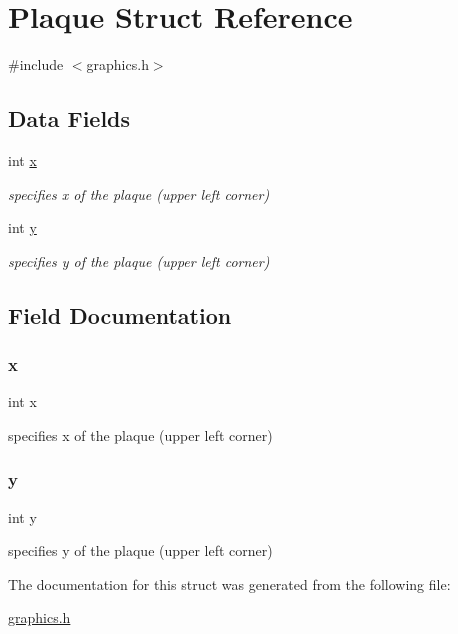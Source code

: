 \hypertarget{struct_plaque}{}\section{Plaque Struct Reference}
\label{struct_plaque}


{\ttfamily \#include $<$graphics.\+h$>$}

\subsection*{Data Fields}
\begin{DoxyCompactItemize}
\item 
int \hyperlink{struct_plaque_a6150e0515f7202e2fb518f7206ed97dc}{x}
\begin{DoxyCompactList}\small\item\em specifies x of the plaque (upper left corner) \end{DoxyCompactList}\item 
int \hyperlink{struct_plaque_a0a2f84ed7838f07779ae24c5a9086d33}{y}
\begin{DoxyCompactList}\small\item\em specifies y of the plaque (upper left corner) \end{DoxyCompactList}\end{DoxyCompactItemize}


\subsection{Field Documentation}
\mbox{\label{struct_plaque_a6150e0515f7202e2fb518f7206ed97dc}} 
\subsubsection{\texorpdfstring{x}{x}}
{\footnotesize\ttfamily int x}



specifies x of the plaque (upper left corner) 

\mbox{\label{struct_plaque_a0a2f84ed7838f07779ae24c5a9086d33}} 
\subsubsection{\texorpdfstring{y}{y}}
{\footnotesize\ttfamily int y}



specifies y of the plaque (upper left corner) 



The documentation for this struct was generated from the following file\+:\begin{DoxyCompactItemize}
\item 
\hyperlink{graphics_8h}{graphics.\+h}\end{DoxyCompactItemize}

